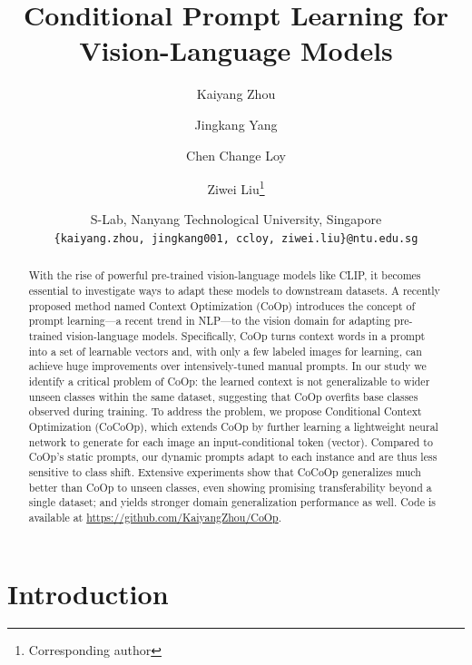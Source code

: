 \documentclass[10pt,twocolumn,letterpaper]{article}
\begin{document}
\title{Conditional Prompt Learning for Vision-Language Models}

\author{
Kaiyang Zhou \and
Jingkang Yang \and
Chen Change Loy \and
Ziwei Liu\thanks{Corresponding author}
\and
S-Lab, Nanyang Technological University, Singapore \\
{\tt\small \{kaiyang.zhou, jingkang001, ccloy, ziwei.liu\}@ntu.edu.sg}
}
\maketitle



\begin{abstract}
With the rise of powerful pre-trained vision-language models like CLIP, it becomes essential to investigate ways to adapt these models to downstream datasets. A recently proposed method named Context Optimization (CoOp) introduces the concept of prompt learning---a recent trend in NLP---to the vision domain for adapting pre-trained vision-language models. Specifically, CoOp turns context words in a prompt into a set of learnable vectors and, with only a few labeled images for learning, can achieve huge improvements over intensively-tuned manual prompts. In our study we identify a critical problem of CoOp: the learned context is not generalizable to wider unseen classes within the same dataset, suggesting that CoOp overfits base classes observed during training. To address the problem, we propose Conditional Context Optimization (CoCoOp), which extends CoOp by further learning a lightweight neural network to generate for each image an input-conditional token (vector). Compared to CoOp's static prompts, our dynamic prompts adapt to each instance and are thus less sensitive to class shift. Extensive experiments show that CoCoOp generalizes much better than CoOp to unseen classes, even showing promising transferability beyond a single dataset; and yields stronger domain generalization performance as well. Code is available at \url{https://github.com/KaiyangZhou/CoOp}.
\end{abstract}



\section{Introduction}
\label{sec:intro}
\end{document}
